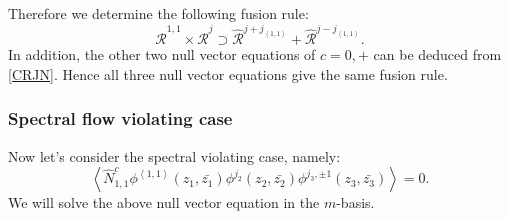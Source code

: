\documentclass[10pt,a4paper]{article}
\numberwithin{equation}{section}
\newcommand{\vev}[1]{\left\langle #1 \right\rangle}
\begin{document}
Therefore we determine the following fusion rule:
\begin{equation}
    \widehat{\mathcal{R}}^{1,1} \times \widehat{\mathcal{R}}^{j} \supset \widehat{\mathcal{R}}^{j+j_{\vev{1,1}}} + \widehat{\mathcal{R}}^{j-j_{\vev{1,1}}}.
\end{equation}
In addition, the other two null vector equations of $c = 0,+$ can be deduced from \eqref{CRJN}. Hence all three null vector equations give the 
same fusion rule. 

\subsubsection*{Spectral flow violating case}
Now let's consider the spectral violating case, namely:
\begin{equation}
    \vev{\hat{N}^{c}_{1,1} \phi^{\vev{1,1}}(z_{1},\bar{z_{1}}) \phi^{j_{2}}(z_{2},\bar{z_{2}})
     \phi^{j_{3},\pm 1}(z_{3}, \bar{z_{3}})} = 0.
\end{equation}
We will solve the above null vector equation in the $m$-basis.
\end{document}
